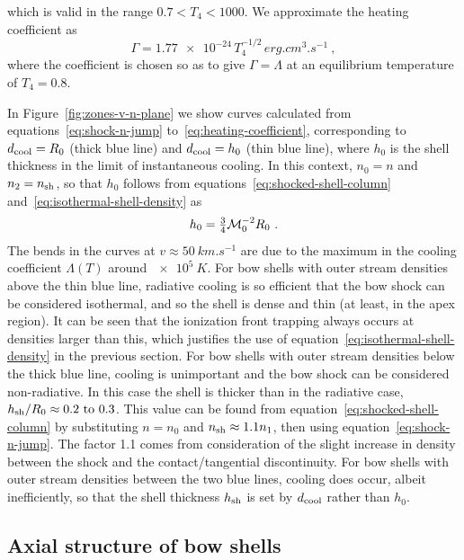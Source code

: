 which is valid in the range \(0.7 < T_4 < 1000\).  We approximate the heating coefficient as
\begin{equation}
  \label{eq:heating-coefficient}
  \Gamma = \num{1.77e-24} \, T_4^{-1/2} \, \si{erg.cm^{3}.s^{-1}} \ ,
\end{equation}
where the coefficient is chosen so as to give \(\Gamma = \Lambda\) at
an equilibrium temperature of \(T_4 = 0.8\).

In Figure~\ref{fig:zones-v-n-plane} we show curves calculated from
equations~\eqref{eq:shock-n-jump} to~\eqref{eq:heating-coefficient},
corresponding to \(d_{\text{cool}} = R_0\) (thick blue line) and
\(d_{\text{cool}} = h_0\) (thin blue line), where \(h_0\) is the shell
thickness in the limit of instantaneous cooling.  In this context,
\(n_0 = n\) and \(n_2 = n_{\text{sh}}\), so that \(h_0\) follows from
equations~\eqref{eq:shocked-shell-column}
and~\eqref{eq:isothermal-shell-density} as
\begin{equation}
  \label{eq:strong-cooling-h0}
  h_0 = \tfrac34 \mathcal{M}_0^{-2} R_0 \ .
\end{equation}
The bends in the curves at \(v \approx \SI{50}{km.s^{-1}}\) are due to the
maximum in the cooling coefficient \(\Lambda(T)\) around
\(\SI{e5}{K}\).  For bow shells with outer stream densities above the thin
blue line, radiative cooling is so efficient that the bow shock can be
considered isothermal, and so the shell is dense and thin (at least,
in the apex region).  It can be seen that the ionization front
trapping always occurs at densities larger than this, which justifies
the use of equation~\eqref{eq:isothermal-shell-density} in the
previous section.  For bow shells with outer stream densities below the
thick blue line, cooling is unimportant and the bow shock can be
considered non-radiative.  In this case the shell is thicker than in
the radiative case,
\(h\shell/R_0 \approx \text{\numrange{0.2}{0.3}}\).  This value can be found
from equation~\eqref{eq:shocked-shell-column} by substituting
\(n = n_0\) and \(n_{\text{sh}} \approx 1.1 n_1\), then using
equation~\eqref{eq:shock-n-jump}. The factor \num{1.1} comes from
consideration of the slight increase in density between the shock and
the contact/tangential discontinuity.  For bow shells with outer stream
densities between the two blue lines, cooling does occur, albeit
inefficiently, so that the shell thickness \(h_{\text{sh}}\) is set by
\(d_{\text{cool}}\) rather than \(h_0\).

\subsection{Axial structure of bow shells}
\label{sec:axial-structure-bow}

